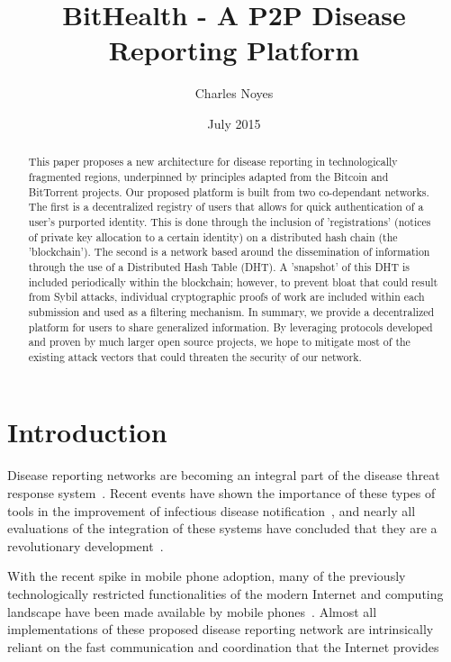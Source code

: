 \documentclass{article}
\title{BitHealth - A P2P Disease Reporting Platform}
\author{Charles Noyes}
\date{July 2015}
\begin{document}
\maketitle

\begin{abstract}
This paper proposes a new architecture for disease reporting in technologically fragmented regions, underpinned by principles adapted from the Bitcoin and BitTorrent projects. Our proposed platform is built from two co-dependant networks. The first is a decentralized registry of users that allows for quick authentication of a user's purported identity. This is done through the inclusion of 'registrations' (notices of private key allocation to a certain identity) on a distributed hash chain (the 'blockchain'). The second is a network based around the dissemination of information through the use of a Distributed Hash Table (DHT). A 'snapshot' of this DHT is included periodically within the blockchain; however, to prevent bloat that could result from Sybil attacks, individual cryptographic proofs of work are included within each submission and used as a filtering mechanism. In summary, we provide a decentralized platform for users to share generalized information. By leveraging protocols developed and proven by much larger open source projects, we hope to mitigate most of the existing attack vectors that could threaten the security of our network.
\end{abstract}


\maketitle

\section{Introduction}
\par Disease reporting networks are becoming an integral part of the disease threat response system~\cite{Heymann:1998tyba}. Recent events have shown the importance of these types of tools in the improvement of infectious disease notification~\cite{Ward:2005vkba}, and nearly all evaluations of the integration of these systems have concluded that they are a revolutionary development~\cite{Jajosky:2004tyba,Lazarus:2009wzba,Overhage:2001vqba}. 

\par With the recent spike in mobile phone adoption, many of the previously technologically restricted functionalities of the modern Internet and computing landscape have been made available by mobile phones~\cite{Buford:2009jn}. Almost all implementations of these proposed disease reporting network are intrinsically reliant on the fast communication and coordination that the Internet provides~\cite{Rolfhamre:2005wy,Krause:2007wn}

\printbibliography
\end{document}
